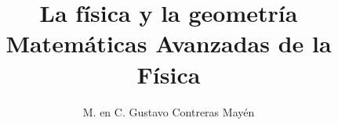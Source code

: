 
\usepackage{standalone}
\usepackage{tikz-3dplot}

\title{La física y la geometría \\[0.3em]  \large{Matemáticas Avanzadas de la Física}\vspace{-3ex}}
\author{M. en C. Gustavo Contreras Mayén}
\date{ }


\vspace{-4cm}
\maketitle
\fontsize{14}{14}\selectfont
\tableofcontents
\newpage






